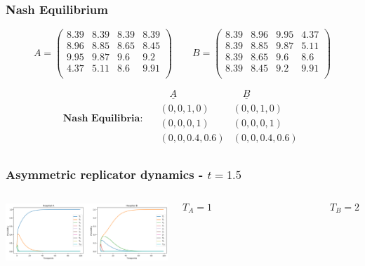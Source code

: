 \begin{frame}
    \frametitle{Nash Equilibrium}
    \centering

    \small
    \begin{equation*}
        A = 
        \begin{pmatrix}
            8.39 & 8.39 & 8.39 & 8.39 \\
            8.96 & 8.85 & 8.65 & 8.45 \\
            9.95 & 9.87 & 9.6  & 9.2  \\
            4.37 & 5.11 & 8.6  & 9.91 \\
        \end{pmatrix} \qquad
        B = 
        \begin{pmatrix}
            8.39 & 8.96 & 9.95 & 4.37 \\
            8.39 & 8.85 & 9.87 & 5.11 \\
            8.39 & 8.65 & 9.6 &  8.6 \\ 
            8.39 & 8.45 & 9.2 &  9.91 \\
        \end{pmatrix}
    \end{equation*}

    \vspace{1cm}

    \begin{equation*}
        \textbf{Nash Equilibria: } \quad
        \begin{array}{c|c}
            \underline{\quad A \quad} & \underline{\quad B \quad} \\
            (0, 0, 1, 0) & (0, 0, 1, 0) \\ 
            \hline
            (0, 0, 0, 1) & (0, 0, 0, 1) \\ 
            \hline
            (0, 0, 0.4, 0.6) & (0, 0, 0.4, 0.6) \\
        \end{array}
    \end{equation*}
\end{frame}

\begin{frame}
    \frametitle{Asymmetric replicator dynamics - \(t = 1.5\)}
    \begin{columns}
        \centering
        \column{\dimexpr\paperwidth-10pt}
        \includegraphics[width=\textwidth]{Bin/replicator_dynamics/ard_t_1.5.png}

        \[T_A = 1  \qquad \qquad \qquad \qquad \qquad \qquad T_B = 2\]
    \end{columns}

\end{frame}


